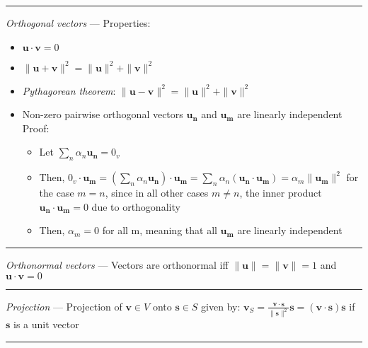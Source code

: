 {\color{lightgray}\hrule height 0.001mm}

\emph{Orthogonal vectors} ---  Properties:
\begin{itemize}
    \item $\boldsymbol{u} \cdot \boldsymbol{v} = 0$
    \item $\|\boldsymbol{u} + \boldsymbol{v}\|^2 = \|\boldsymbol{u}\|^2 + \|\boldsymbol{v}\|^2$
    \item \emph{Pythagorean theorem}: $\|\boldsymbol{u} - \boldsymbol{v}\|^2 = \|\boldsymbol{u}\|^2 + \|\boldsymbol{v}\|^2$
    \item Non-zero pairwise orthogonal vectors $\boldsymbol{u_n}$ and $\boldsymbol{u_m}$ are linearly independent\\
    Proof:
    \begin{itemize}
        \item Let $\sum_n \alpha_n \boldsymbol{u_n} = 0_v$
        \item Then, $0_v \cdot \boldsymbol{u_m} = (\sum_n \alpha_n \boldsymbol{u_n}) \cdot \boldsymbol{u_m} = \sum_n \alpha_n (\boldsymbol{u_n} \cdot \boldsymbol{u_m}) = \alpha_m \|\boldsymbol{u_m}\|^2$ for the case $m = n$, since in all other cases $m \neq n$, the inner product $\boldsymbol{u_n} \cdot \boldsymbol{u_m} = 0$ due to orthogonality
        \item Then, $\alpha_m = 0$ for all m, meaning that all $\boldsymbol{u_m}$ are linearly independent
    \end{itemize}
\end{itemize}

{\color{lightgray}\hrule height 0.001mm}

\emph{Orthonormal vectors} ---  Vectors are orthonormal iff $\|\boldsymbol{u}\| = \|\boldsymbol{v}\| = 1$ and $\boldsymbol{u} \cdot \boldsymbol{v} = 0$

{\color{lightgray}\hrule height 0.001mm}

\emph{Projection} --- Projection of $\boldsymbol{v} \in V$ onto $\boldsymbol{s} \in S$ given by: $\boldsymbol{v}_S = \frac{\boldsymbol{v} \cdot \boldsymbol{s}}{\|\boldsymbol{s}\|^2}\boldsymbol{s} = (\boldsymbol{v} \cdot \boldsymbol{s})\boldsymbol{s}$ if $\boldsymbol{s}$ is a unit vector

{\color{black}\hrule height 0.001mm}

